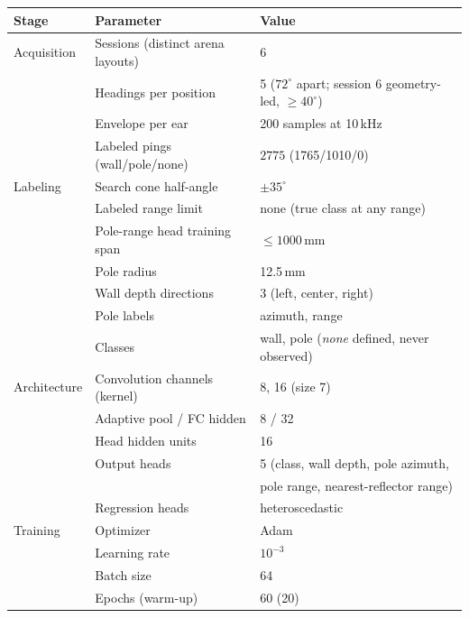 \documentclass[11pt]{article}
\begin{document}
\begin{table}[htb]
\centering
\begin{tabular}{lll}
\hline
\textbf{Stage} & \textbf{Parameter} & \textbf{Value} \\
\hline
Acquisition  & Sessions (distinct arena layouts) & 6 \\
             & Headings per position             & 5 ($72^{\circ}$ apart; session 6 geometry-led, $\geq 40^{\circ}$) \\
             & Envelope per ear                  & 200 samples at 10\,kHz \\
             & Labeled pings (wall/pole/none)    & $2775$ (1765/1010/0) \\
Labeling     & Search cone half-angle            & $\pm 35^{\circ}$ \\
             & Labeled range limit               & none (true class at any range) \\
             & Pole-range head training span     & $\leq 1000$\,mm \\
             & Pole radius                       & 12.5\,mm \\
             & Wall depth directions             & 3 (left, center, right) \\
             & Pole labels                       & azimuth, range \\
             & Classes                           & wall, pole (\emph{none} defined, never observed) \\
Architecture & Convolution channels (kernel)     & 8, 16 (size 7) \\
             & Adaptive pool / FC hidden         & 8 / 32 \\
             & Head hidden units                 & 16 \\
             & Output heads                      & 5 (class, wall depth, pole azimuth, \\
             &                                   & pole range, nearest-reflector range) \\
             & Regression heads                  & heteroscedastic \\
Training     & Optimizer                         & Adam \\
             & Learning rate                     & $10^{-3}$ \\
             & Batch size                        & 64 \\
             & Epochs (warm-up)                  & 60 (20) \\

\end{tabular}
\end{table}
\end{document}
